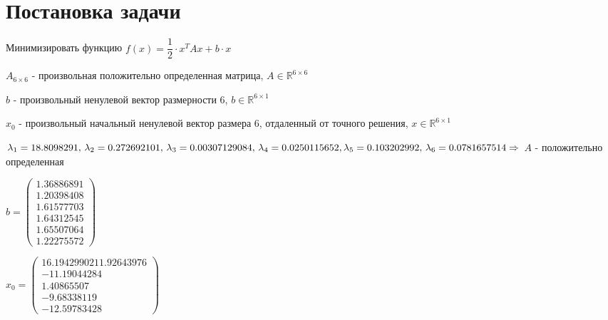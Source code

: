\documentclass[a4paper, 14pt]{extarticle}
\begin{document}
	\pagebreak	

	\section{Постановка задачи}
		Минимизировать функцию $ f(x) = \dfrac{1}{2} \cdot x^TAx + b \cdot x$
		
		$A_{6\times6}$ - произвольная положительно определенная матрица, $A \in \mathbb{R}^{6\times6}$
		
		$b$	- произвольный ненулевой вектор размерности 6, $b \in \mathbb{R}^{6\times1}$ 
		
		$x_0$ - произвольный начальный ненулевой вектор размера 6, отдаленный от точного решения, $ x \in \mathbb{R}^{6\times1} $
		
		
		$ \lambda_1 = 18.8098291,\, \lambda_2 = 0.272692101,\, \lambda_3 = 0.00307129084,\, \lambda_4 = 0.0250115652,\,\\ \lambda_5 = 0.103202992,\, \lambda_6 = 0.0781657514 \Rightarrow $ $A$ - положительно определенная
		
		$b = \begin{pmatrix} 
				1.36886891\\
				1.20398408\\
				1.61577703\\
				1.64312545\\
				1.65507064\\
				1.22275572
			\end{pmatrix}  $
		
		$x_0 = \begin{pmatrix} 
			16.19429902
			11.92643976\\
			-11.19044284\\
			1.40865507\\
			-9.68338119\\
			-12.59783428
		\end{pmatrix}  $		
	
\end{document}
